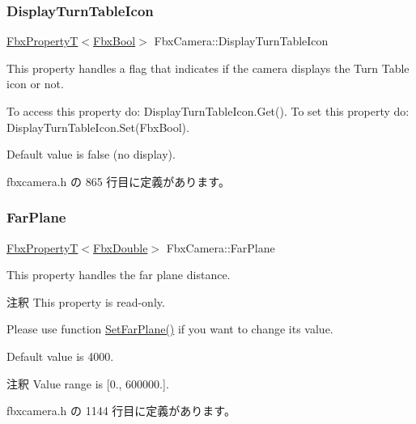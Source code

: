 \subsubsection{\texorpdfstring{Display\+Turn\+Table\+Icon}{DisplayTurnTableIcon}}
{\footnotesize\ttfamily \hyperlink{class_fbx_property_t}{Fbx\+PropertyT}$<$\hyperlink{fbxtypes_8h_a92e0562b2fe33e76a242f498b362262e}{Fbx\+Bool}$>$ Fbx\+Camera\+::\+Display\+Turn\+Table\+Icon}

This property handles a flag that indicates if the camera displays the Turn Table icon or not.

To access this property do\+: Display\+Turn\+Table\+Icon.\+Get(). To set this property do\+: Display\+Turn\+Table\+Icon.\+Set(\+Fbx\+Bool).

Default value is false (no display). 

 fbxcamera.\+h の 865 行目に定義があります。

\mbox{\label{class_fbx_camera_a72de3e07e3d77face8a1412599facf73}} 
\subsubsection{\texorpdfstring{Far\+Plane}{FarPlane}}
{\footnotesize\ttfamily \hyperlink{class_fbx_property_t}{Fbx\+PropertyT}$<$\hyperlink{fbxtypes_8h_a171e72a1c46fc15c1a6c9c31948c1c5b}{Fbx\+Double}$>$ Fbx\+Camera\+::\+Far\+Plane}

This property handles the far plane distance.

\begin{DoxyRemark}{注釈}
This property is read-\/only. 

Please use function \hyperlink{class_fbx_camera_a23f2f8bba739049a5e0ea55213085787}{Set\+Far\+Plane()} if you want to change its value.
\end{DoxyRemark}
Default value is 4000. \begin{DoxyRemark}{注釈}
Value range is \mbox{[}0., 600000.\mbox{]}. 
\end{DoxyRemark}


 fbxcamera.\+h の 1144 行目に定義があります。

\mbox{\label{class_fbx_camera_acec3ce4b786d019a16a2de9f23ff42d8}} 
